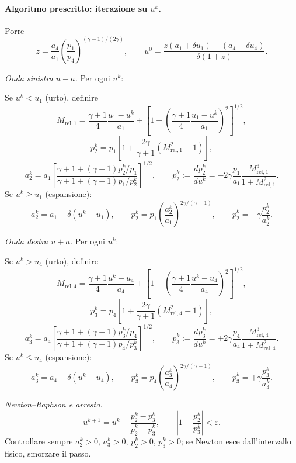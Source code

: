 \documentclass[11pt,a4paper]{article}
\begin{document}

\paragraph*{Algoritmo prescritto: iterazione su $u^k$.}
Porre
\[
z=\frac{a_4}{a_1}\left(\frac{p_1}{p_4}\right)^{(\gamma-1)/(2\gamma)},
\qquad
u^0=\frac{z(a_1+\delta u_1)-(a_4-\delta u_4)}{\delta(1+z)}.
\]

\emph{Onda sinistra $u-a$.} Per ogni $u^k$:

Se $u^k<u_1$ (urto), definire
\[
M_{\mathrm{rel},1}=\frac{\gamma+1}{4}\frac{u_1-u^k}{a_1}
+\left[1+\left(\frac{\gamma+1}{4}\frac{u_1-u^k}{a_1}\right)^2\right]^{1/2},
\]
\[
p_2^k=p_1\left[1+\frac{2\gamma}{\gamma+1}
(M_{\mathrm{rel},1}^2-1)\right],
\]
\[
a_2^k=a_1\left[
\frac{\gamma+1+(\gamma-1)p_2^k/p_1}
{\gamma+1+(\gamma-1)p_1/p_2^k}
\right]^{1/2},
\qquad
\dot p_2^k:=\frac{dp_2^k}{du^k}
=-2\gamma\frac{p_1}{a_1}\frac{M_{\mathrm{rel},1}^3}{1+M_{\mathrm{rel},1}^2}.
\]
Se $u^k\ge u_1$ (espansione):
\[
a_2^k=a_1-\delta(u^k-u_1),\qquad
p_2^k=p_1\left(\frac{a_2^k}{a_1}\right)^{2\gamma/(\gamma-1)},
\qquad
\dot p_2^k=-\gamma\frac{p_2^k}{a_2^k}.
\]

\emph{Onda destra $u+a$.} Per ogni $u^k$:

Se $u^k>u_4$ (urto), definire
\[
M_{\mathrm{rel},4}=\frac{\gamma+1}{4}\frac{u^k-u_4}{a_4}
+\left[1+\left(\frac{\gamma+1}{4}\frac{u^k-u_4}{a_4}\right)^2\right]^{1/2},
\]
\[
p_3^k=p_4\left[1+\frac{2\gamma}{\gamma+1}
(M_{\mathrm{rel},4}^2-1)\right],
\]
\[
a_3^k=a_4\left[
\frac{\gamma+1+(\gamma-1)p_3^k/p_4}
{\gamma+1+(\gamma-1)p_4/p_3^k}
\right]^{1/2},
\qquad
\dot p_3^k:=\frac{dp_3^k}{du^k}
=+2\gamma\frac{p_4}{a_4}\frac{M_{\mathrm{rel},4}^3}{1+M_{\mathrm{rel},4}^2}.
\]
Se $u^k\le u_4$ (espansione):
\[
a_3^k=a_4+\delta(u^k-u_4),\qquad
p_3^k=p_4\left(\frac{a_3^k}{a_4}\right)^{2\gamma/(\gamma-1)},
\qquad
\dot p_3^k=+\gamma\frac{p_3^k}{a_3^k}.
\]

\emph{Newton--Raphson e arresto.}
\[
u^{k+1}=u^k-\frac{p_2^k-p_3^k}{\dot p_2^k-\dot p_3^k},
\qquad
\left|1-\frac{p_2^k}{p_3^k}\right|<\varepsilon.
\]
Controllare sempre $a_2^k>0$, $a_3^k>0$, $p_2^k>0$, $p_3^k>0$; se Newton
esce dall'intervallo fisico, smorzare il passo.
\end{document}
